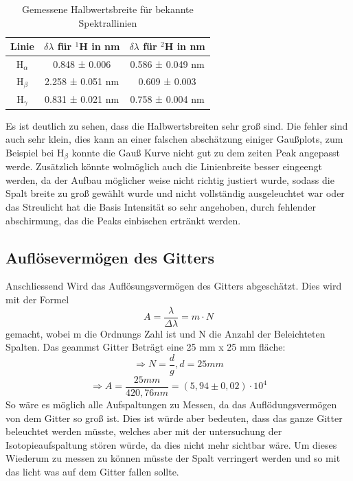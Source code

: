 \begin{table}[htbp]
    \centering
    \begin{tabular}{|c|c|c|}
    Linie & $\delta\lambda$ für $^1$H in nm & $\delta\lambda$ für $^2$H in nm \\
    \hline
        H$_\alpha$ & 0.848 ± 0.006 & 0.586 ± 0.049 nm \\
        H$_\beta$ & 2.258 ± 0.051 nm & 0.609 ± 0.003 \\
        H$_\gamma$ & 0.831 ± 0.021 nm & 0.758 ± 0.004 nm
    \end{tabular}
    \caption{Gemessene Halbwertsbreite für bekannte Spektrallinien}
    \label{tab:gemhalb}
\end{table}
Es ist deutlich zu sehen, dass die Halbwertsbreiten sehr groß sind. 
Die fehler sind auch sehr klein, dies kann an einer falschen abschätzung einiger Gaußplots, zum Beispiel bei H$_\beta$ konnte die Gauß Kurve nicht gut zu dem zeiten Peak angepasst werde.
Zusätzlich könnte wolmöglich auch die Linienbreite besser eingeengt werden, da der Aufbau möglicher weise nicht richtig justiert wurde, sodass die Spalt breite zu groß gewählt wurde und nicht vollständig ausgeleuchtet war oder das Streulicht hat die Basis Intensität so sehr angehoben, durch fehlender abschirmung, das die Peaks einbischen ertränkt werden.


\subsection{Auflösevermögen des Gitters}

Anschliessend Wird das Auflösungsvermögen des Gitters abgeschätzt. 
Dies wird mit der Formel 
\begin{equation}
    A = \frac{\lambda}{\Delta\lambda} = m \cdot N
\end{equation}
gemacht, wobei m die Ordnungs Zahl ist und N die Anzahl der Beleichteten Spalten. 
Das geammst Gitter Beträgt eine 25 mm x 25 mm fläche:
\begin{equation}
    \Rightarrow N = \frac{d}{g}, d = 25mm
\end{equation}
\begin{equation}
    \Rightarrow A = \frac{25mm}{420,76nm} = (5,94 \pm 0,02) \cdot 10^4
\end{equation}
So wäre es möglich alle Aufspaltungen zu Messen, da das Auflödungsvermögen von dem Gitter so groß ist. 
Dies ist würde aber bedeuten, dass das ganze Gitter beleuchtet werden müsste, welches aber mit der untersuchung der Isotopieaufspaltung stören würde, da dies nicht mehr sichtbar wäre.
Um dieses Wiederum zu messen zu können müsste der Spalt verringert werden und so mit das licht was auf dem Gitter fallen sollte.
